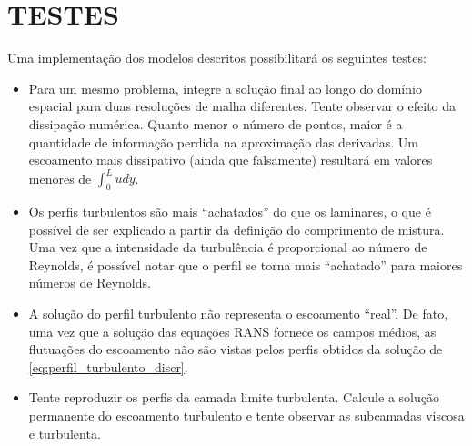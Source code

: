 
\section{TESTES}

Uma implementação dos modelos descritos possibilitará os seguintes testes:

\begin{itemize}
   \item Para um mesmo problema, integre a solução final ao longo do domínio espacial para duas resoluções de malha diferentes. Tente observar o efeito da dissipação numérica. Quanto menor o número de pontos, maior é a quantidade de informação perdida na aproximação das derivadas. Um escoamento mais dissipativo (ainda que falsamente) resultará em valores menores de $\int_0^Ludy$.
   \item Os perfis turbulentos são mais ``achatados'' do que os laminares, o que é possível de ser explicado a partir da definição do comprimento de mistura. Uma vez que a intensidade da turbulência é proporcional ao número de Reynolds, é possível notar que o perfil se torna mais ``achatado'' para maiores números de Reynolds.
   \item A solução do perfil turbulento não representa o escoamento ``real''. De fato, uma vez que a solução das equações RANS fornece os campos médios, as flutuações do escoamento não são vistas pelos perfis obtidos da solução de \ref{eq:perfil_turbulento_discr}.
   \item Tente reproduzir os perfis da camada limite turbulenta. Calcule a solução permanente do escoamento turbulento e tente observar as subcamadas viscosa e turbulenta.
\end{itemize}

